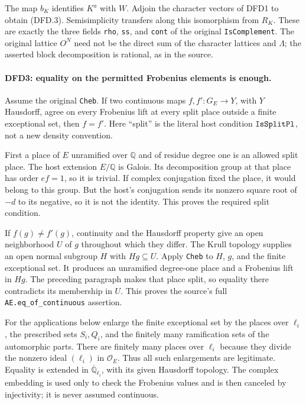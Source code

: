 The map $b_K$ identifies $K^a$ with $W$. Adjoin the character
vectors of DFD1 to obtain (DFD.3). Semisimplicity transfers along
this isomorphism from $R_K$. These are exactly the three fields
\texttt{rho}, \texttt{ss}, and \texttt{cont} of the original
\texttt{Is\allowbreak Complement}. The original lattice $O^N$ need not be
the direct sum of the character lattices and $\Lambda$; the
asserted block decomposition is rational, as in the source.

\paragraph{DFD3: equality on the permitted Frobenius elements is enough.}
\label{claim:DFD3}
Assume the original \texttt{Cheb}. If two continuous maps
$f,f':G_E\to Y$, with $Y$ Hausdorff, agree on every Frobenius lift
at every split place outside a finite exceptional set, then $f=f'$.
Here ``split'' is the literal host condition
$\texttt{Is\allowbreak Split\allowbreak Pl}$, not a new density convention.

First a place of $E$ unramified over $\mathbb Q$ and of residue
degree one is an allowed split place. The host extension
$E/\mathbb Q$ is Galois. Its decomposition group at that place
has order $ef=1$, so it is trivial. If complex conjugation fixed
the place, it would belong to this group. But the host's
conjugation sends its nonzero square root of $-d$ to its negative,
so it is not the identity. This proves the required split
condition.

If $f(g)\ne f'(g)$, continuity and the Hausdorff property give an
open neighborhood $U$ of $g$ throughout which they differ.
The Krull topology supplies an open normal subgroup $H$ with
$Hg\subseteq U$. Apply \texttt{Cheb} to $H$, $g$, and the finite
exceptional set. It produces an unramified degree-one place and
a Frobenius lift in $Hg$. The preceding paragraph makes that
place split, so equality there contradicts its membership in
$U$. This proves the source's full
\texttt{AE.eq\_\allowbreak of\_\allowbreak continuous} assertion.

For the applications below enlarge the finite exceptional set
by the places over $\ell_i$, the prescribed sets $S_i,Q_i$, and
the finitely many ramification sets of the automorphic parts.
There are finitely many places over $\ell_i$ because they divide
the nonzero ideal $(\ell_i)$ in $\mathcal O_E$. Thus all such
enlargements are legitimate. Equality is extended in
$\overline{\mathbb Q}_{\ell_i}$, with its given Hausdorff
topology. The complex embedding is used only to check the
Frobenius values and is then canceled by injectivity; it is
never assumed continuous.

